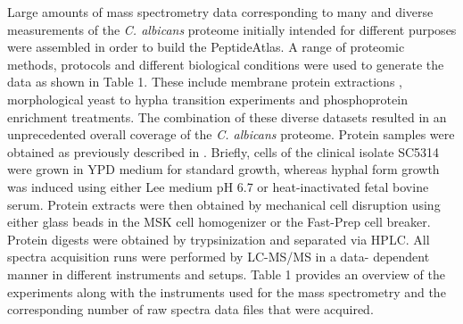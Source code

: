 Large amounts of mass spectrometry data corresponding to
many and diverse measurements of the \textit{C. albicans} proteome
initially intended for different purposes were assembled in order
to build the PeptideAtlas. A range of proteomic methods,
protocols and different biological conditions were used to
generate the data as shown in Table 1. These include membrane
protein extractions \citep{Cabezon2009}, morphological yeast to hypha transition
experiments \citep{Monteoliva2010} and phosphoprotein enrichment treatments.
The combination of these diverse datasets resulted in an
unprecedented overall coverage of the \textit{C. albicans} proteome.
Protein samples were obtained as previously described in \citep{Monteoliva2010}.
Briefly, cells of the clinical isolate SC5314 were grown in YPD
medium for standard growth, whereas hyphal form growth was
induced using either Lee medium pH 6.7 or heat-inactivated
fetal bovine serum. Protein extracts were then obtained by
mechanical cell disruption using either glass beads in the MSK
cell homogenizer or the Fast-Prep cell breaker. Protein digests
were obtained by trypsinization and separated via HPLC. All
spectra acquisition runs were performed by LC-MS/MS in a data-
dependent manner in different instruments and setups. Table 1
provides an overview of the experiments along with the
instruments used for the mass spectrometry and the corresponding
 number of raw spectra data files that were acquired.
 


